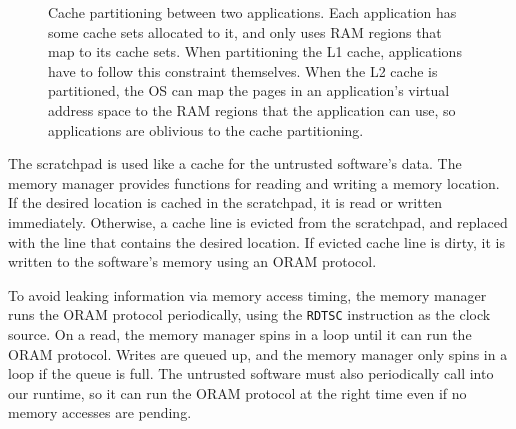 \begin{figure}[hbtp]
  \caption{
    Cache partitioning between two applications. Each application has some
    cache sets allocated to it, and only uses RAM regions that map to its cache
    sets. When partitioning the L1 cache, applications have to follow this
    constraint themselves. When the L2 cache is partitioned, the OS can map the
    pages in an application's virtual address space to the RAM regions that the
    application can use, so applications are oblivious to the cache
    partitioning.
  }
  \label{fig:cache_partitions}
\end{figure}


The scratchpad is used like a cache for the untrusted software's data. The
memory manager provides functions for reading and writing a memory location.
If the desired location is cached in the scratchpad, it is read or written
immediately. Otherwise, a cache line is evicted from the scratchpad, and
replaced with the line that contains the desired location. If evicted cache
line is dirty, it is written to the software's memory using an ORAM protocol.

To avoid leaking information via memory access timing, the memory manager
runs the ORAM protocol periodically, using the \texttt{RDTSC} instruction as
the clock source. On a read, the memory manager spins in a loop until it can
run the ORAM protocol. Writes are queued up, and the memory manager only spins
in a loop if the queue is full. The untrusted software must also periodically
call into our runtime, so it can run the ORAM protocol at the right time
even if no memory accesses are pending.

